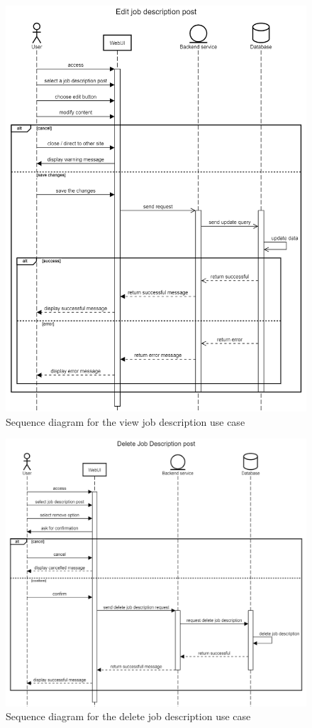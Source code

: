 \documentclass[a4paper]{article}
\begin{document}
\begin{figure}[H]
  \centering
  \includegraphics[width=1.0\textwidth]{Edit job description post.png}
  \caption{Sequence diagram for the view job description use case}
  \label{fig:fig15}
\end{figure}

\begin{figure}[H]
  \centering
  \includegraphics[width=1.0\textwidth]{Delete job description post.png}
  \caption{Sequence diagram for the delete job description use case}
  \label{fig:fig16}
\end{figure}
\end{document}
